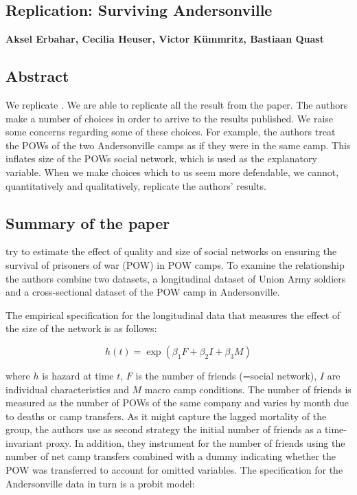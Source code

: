 \documentclass[a4paper]{report}\usepackage{graphicx, color}
\begin{document}
\begin{refsection}
\chapter{Replication: Surviving Andersonville}
\label{andersonville}
\textbf{Aksel Erbahar, Cecilia Heuser, Victor K\"ummritz, Bastiaan Quast}

\section*{Abstract}
We replicate \textcite{costa2007surviving}. We are able to replicate all the result from the paper. The authors make a number of choices in order to arrive to the results published. We raise some concerns regarding some of these choices. For example, the authors treat the POWs of the two Andersonville camps as if they were in the same camp. This inflates size of the POWs social network, which is used as the explanatory variable. When we make choices which to us seem more defendable, we cannot, quantitatively and qualitatively, replicate the authors' results.

\section{Summary of the paper}
\textcite{costa2007surviving} try to estimate the effect of quality and size of social networks on ensuring the survival of prisoners of war (POW) in POW camps. To examine the relationship the authors combine two datasets, a longitudinal dataset of Union Army soldiers and a cross-sectional dataset of the POW camp in Andersonville. 

The empirical specification for the longitudinal data that measures the effect of the size of the network is as follows:

\begin{equation} \label{eq:ht}
h(t) = \exp ( \beta_1 F + \beta_2 I + \beta_3 M )
\end{equation}

where $h$ is hazard at time $t$, $F$ is the number of friends (=social network), $I$ are individual characteristics and $M$ macro camp conditions. The number of friends is measured as the number of POWs of the same company and varies by month due to deaths or camp transfers. As it might capture the lagged mortality of the group, the authors use as second strategy the initial number of friends as a time-invariant proxy. In addition, they instrument for the number of friends using the number of net camp transfers combined with a dummy indicating whether the POW was transferred to account for omitted variables. 
The specification for the Andersonville data in turn is a probit model:


\end{refsection}
\end{document}
